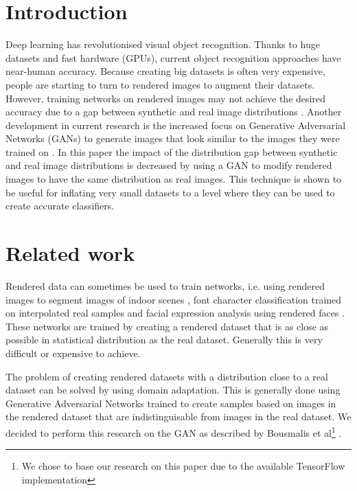 \documentclass[10pt,twocolumn,letterpaper]{article}
\begin{document}
\section{Introduction}

Deep learning has revolutionised visual object recognition. Thanks to huge datasets and fast hardware (GPUs), current object recognition approaches have near-human accuracy.
Because creating big datasets is often very expensive, people are starting to turn to rendered images to augment their datasets. However, training networks on rendered images may not achieve the desired accuracy due to a gap between synthetic and real image distributions \cite{10.1.1.151.7688}.
Another development in current research is the increased focus on Generative Adversarial Networks (GANs) to generate images that look similar to the images they were trained on \cite{1406.2661}.
In this paper the impact of the distribution gap between synthetic and real image distributions is decreased by using a GAN to modify rendered images to have the same distribution as real images. This technique is shown to be useful for inflating very small datasets to a level where they can be used to create accurate classifiers.

\section{Related work}
Rendered data can sometimes be used to train networks, i.e. using rendered images to segment images of indoor scenes \cite{10.1.1.94.777}, font character classification trained on interpolated real samples \cite{10.1.1.151.7688} and facial expression analysis using rendered faces \cite{Abbasnejad_2017_ICCV}. These networks are trained by creating a rendered dataset that is as close as possible in statistical distribution as the real dataset. Generally this is very difficult or expensive to achieve.

The problem of creating rendered datasets with a distribution close to a real dataset can be solved by using domain adaptation. This is generally done using Generative Adversarial Networks \cite{1703.05192.pdf, 10.1109/CVPR.2017.18, 10.1007/978-3-319-58347-1} trained to create samples based on images in the rendered dataset that are indistinguisable from images in the real dataset. We decided to perform this research on the GAN as described by Bousmalis et al\footnote{We chose to base our research on this paper due to the available TensorFlow\cite{tensorflow} implementation} \cite{10.1109/CVPR.2017.18}.
\end{document}
